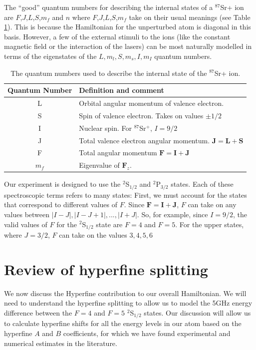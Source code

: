 The ``good'' quantum numbers for describing the internal states of a $^{87}$Sr+ ion are $F$,$J$,$L$,$S$,$m_f$ and $n$\cite{experimental_hyperfine_alkali_arimondo}\cite{cuaMITnotes} where $F$,$J$,$L$,$S$,$m_f$ take on their usual meanings (see Table\,\ref{quantumNumberQuickref}). This is because the Hamiltonian for the unperturbed atom is diagonal in this basis. However, a few of the external stimuli to the ions (like the constant magnetic field or the interaction of the lasers) can be most naturally modelled in terms of the eigenstates of the $L,m_l,S,m_s,I,m_I$ quantum numbers.   

\begin{table}[h!]
\centering
\begin{tabular}{|c|l|}
\hline
Quantum Number & Definition and comment \\ \hline \hline
L & Orbital angular momentum of valence electron. \\ \hline
S & Spin of valence electron. Takes on values $\pm 1/2$ \\ \hline
I & Nuclear spin. For $^{87}$Sr$^+$, $I=9/2$ \\ \hline
J & Total valence electron angular momentum. $\mathbf{J}=\mathbf{L}+\mathbf{S}$ \\ \hline
F & Total angular momentum $\mathbf{F}=\mathbf{I}+\mathbf{J}$ \\ \hline
$m_f$ & Eigenvalue of $\mathbf{F}_z$.\\ \hline
\end{tabular}
\caption{The quantum numbers used to describe the internal state of the $^{87}$Sr+ ion.}
\label{quantumNumberQuickref}
\end{table}

Our experiment is designed to use the $^2$S$_{1/2}$ and $^2$P$_{3/2}$ states. Each of these spectroscopic terms refers to many states: First, we must account for the states that correspond to different values of $F$. Since $\mathbf{F}=\mathbf{I}+\mathbf{J}$, $F$ can take on any values between $|I-J|,|I-J+1|,...,|I+J|$. So, for example, since $I=9/2$, the valid values of $F$ for the $^2$S$_{1/2}$ state are $F=4$ and $F=5$. For the upper states, where $J=3/2$, $F$ can take on the values $3,4,5,6$ 

\section{Review of hyperfine splitting}

We now discuss the Hyperfine contribution to our overall Hamiltonian. We will need to understand the hyperfine splitting to allow us to model the 5GHz energy difference between the $F=4$ and $F=5$ $^2$S$_{1/2}$ states. Our discussion will allow us to calculate hyperfine shifts for all the energy levels in our atom based on the hyperfine $A$ and $B$ coefficients, for which we have found experimental and numerical estimates in the literature.

